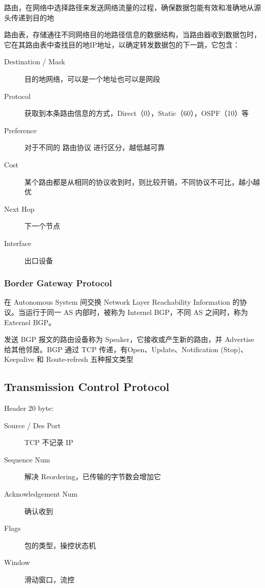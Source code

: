 \documentclass[11pt,journal,compsoc]{IEEEtran}
\begin{document}
路由，在网络中选择路径来发送网络流量的过程，确保数据包能有效和准确地从源头传递到目的地

路由表，存储通往不同网络目的地路径信息的数据结构，当路由器收到数据包时，它在其路由表中查找目的地IP地址，以确定转发数据包的下一跳，它包含：

\begin{description}
    \item[Destination / Mask] 目的地网络，可以是一个地址也可以是网段

    \item[Protocol] 获取到本条路由信息的方式，Direct（0），Static（60），OSPF（10）等

    \item[Preference] 对于不同的 路由协议 进行区分，越低越可靠

    \item[Cost] 某个路由都是从相同的协议收到时，则比较开销，不同协议不可比，越小越优

    \item[Next Hop] 下一个节点

    \item[Interface] 出口设备
\end{description}


\subsubsection{Border Gateway Protocol}

在 Autonomous System 间交换 Network Layer Reachability Information 的协议。当运行于同一 AS 内部时，被称为 Internel BGP，不同 AS 之间时，称为 Externel BGP。

发送 BGP 报文的路由设备称为 Speaker，它接收或产生新的路由，并 Advertise 给其他邻居。BGP 通过 TCP 传递，有Open、Update、Notification (Stop)、Keepalive 和 Route-refresh 五种报文类型


\subsection{Transmission Control Protocol}

Header 20 byte:

\begin{description}
    \item[Source / Des Port] TCP 不记录 IP

    \item[Sequence Num] 解决 Reordering，已传输的字节数会增加它

    \item[Acknowledgement Num] 确认收到

    \item[Flags] 包的类型，操控状态机

    \item[Window] 滑动窗口，流控
\end{description}
\end{document}
